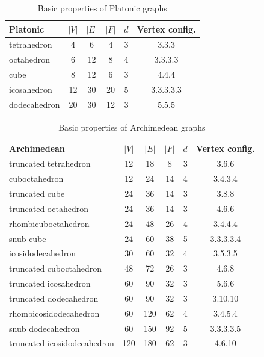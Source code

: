 \begin{table}[H]
\centering
\begin{tabular}{l@{\hspace{1.5cm}}ccccc}
\toprule
\textbf{Platonic} & \textbf{$|V|$} & \textbf{$|E|$} & \textbf{$|F|$} & \textbf{$d$} & \textbf{Vertex config.} \\
\midrule
tetrahedron & 4 & 6 & 4 & 3 & 3.3.3 \\
octahedron & 6 & 12 & 8 & 4 & 3.3.3.3 \\
cube & 8 & 12 & 6 & 3 & 4.4.4 \\
icosahedron & 12 & 30 & 20 & 5 & 3.3.3.3.3 \\
dodecahedron & 20 & 30 & 12 & 3 & 5.5.5 \\
\bottomrule
\end{tabular}
\caption{Basic properties of Platonic graphs}
\label{tab:platonic-basic-props}
\end{table}

\begin{table}[H]
\centering
\begin{tabular}{l@{\hspace{1.5cm}}ccccc}
\toprule
\textbf{Archimedean} & \textbf{$|V|$} & \textbf{$|E|$} & \textbf{$|F|$} & \textbf{$d$} & \textbf{Vertex config.} \\
\midrule
truncated tetrahedron & 12 & 18 & 8 & 3 & 3.6.6 \\
cuboctahedron & 12 & 24 & 14 & 4 & 3.4.3.4 \\
truncated cube & 24 & 36 & 14 & 3 & 3.8.8 \\
truncated octahedron & 24 & 36 & 14 & 3 & 4.6.6 \\
rhombicuboctahedron & 24 & 48 & 26 & 4 & 3.4.4.4 \\
snub cube & 24 & 60 & 38 & 5 & 3.3.3.3.4 \\
icosidodecahedron & 30 & 60 & 32 & 4 & 3.5.3.5 \\
truncated cuboctahedron & 48 & 72 & 26 & 3 & 4.6.8 \\
truncated icosahedron & 60 & 90 & 32 & 3 & 5.6.6 \\
truncated dodecahedron & 60 & 90 & 32 & 3 & 3.10.10 \\
rhombicosidodecahedron & 60 & 120 & 62 & 4 & 3.4.5.4 \\
snub dodecahedron & 60 & 150 & 92 & 5 & 3.3.3.3.5 \\
truncated icosidodecahedron & 120 & 180 & 62 & 3 & 4.6.10 \\
\bottomrule
\end{tabular}
\caption{Basic properties of Archimedean graphs}
\label{tab:archimedean-basic-props}
\end{table}